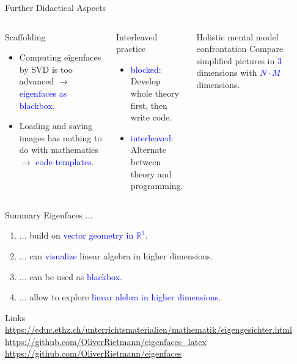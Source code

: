 \documentclass[10pt,aspectratio=169,usenames,dvipsnames,handout]{beamer} %
\begin{document}
\begin{frame}[fragile]{Further Didactical Aspects}
	\begin{columns}[T,onlytextwidth]
		\column{\textwidth}
		\begin{block}{Scaffolding}
			\begin{itemize}
				\item Computing eigenfaces by SVD is too advanced $\rightarrow$ \textcolor{blue}{eigenfaces as blackbox}.
				\item Loading and saving images has nothing to do with mathematics $\rightarrow$ \textcolor{blue}{code-templates}.
			\end{itemize}
		\end{block}
		\begin{block}{Interleaved practice}
			\begin{itemize}
				\item \textcolor{blue}{blocked}: Develop whole theory first, then write code.
				\item \textcolor{blue}{interleaved}: Alternate between theory and programming.
			\end{itemize}
		\end{block}
		\begin{block}{Holistic mental model confrontation}
			Compare simplified pictures in \textcolor{blue}{3} dimensions with \textcolor{blue}{$N\cdot M$} dimensions.
		\end{block}
	\end{columns}
\end{frame}

\begin{frame}[fragile]{Summary}
	Eigenfaces ...\\
	\vspace{0.5cm} \pause
	\begin{enumerate}[1.] \setlength\itemsep{0.5cm}
		\item ... build on \textcolor{blue}{vector geometry in $\mathbb R^3$}. \pause
		\item ... can \textcolor{blue}{visualize} linear algebra in higher dimensions. \pause
		\item ... can be used as \textcolor{blue}{blackbox}. \pause
		\item ... allow to explore \textcolor{blue}{linear alebra in higher dimensions}.
	\end{enumerate}
\end{frame}

\begin{frame}[fragile]{Links}
	\url{https://educ.ethz.ch/unterrichtsmaterialien/mathematik/eigengesichter.html}\\[10pt]
	\url{https://github.com/OliverRietmann/eigenfaces_latex}\\[10pt]
	\url{https://github.com/OliverRietmann/eigenfaces}
\end{frame}
	
\end{document}
